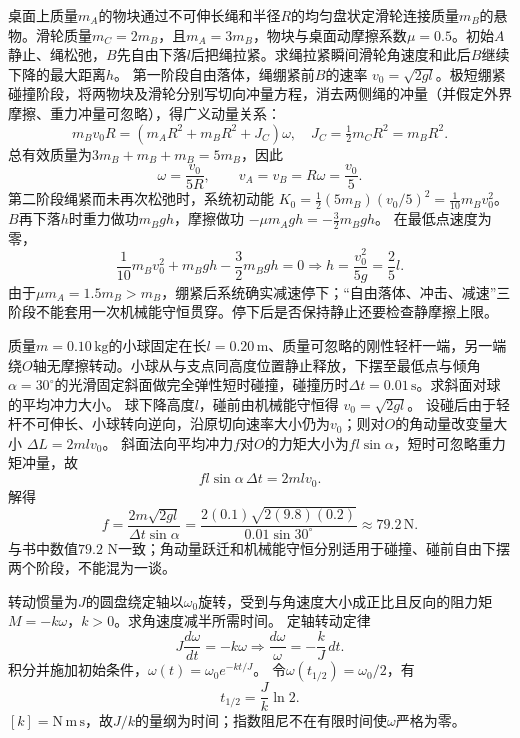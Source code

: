 \problemtext 桌面上质量$m_A$的物块通过不可伸长绳和半径$R$的均匀盘状定滑轮连接质量$m_B$的悬物。滑轮质量$m_C=2m_B$，且$m_A=3m_B$，物块与桌面动摩擦系数$\mu=0.5$。初始$A$静止、绳松弛，$B$先自由下落$l$后把绳拉紧。求绳拉紧瞬间滑轮角速度和此后$B$继续下降的最大距离$h$。
\workings
第一阶段自由落体，绳绷紧前$B$的速率
$v_0=\sqrt{2gl}$。极短绷紧碰撞阶段，将两物块及滑轮分别写切向冲量方程，消去两侧绳的冲量（并假定外界摩擦、重力冲量可忽略），得广义动量关系：
\[
m_Bv_0R=(m_AR^2+m_BR^2+J_C)\omega,\quad
J_C=\tfrac12m_CR^2=m_BR^2.
\]
总有效质量为$3m_B+m_B+m_B=5m_B$，因此
\[
\boxed{\omega=\frac{v_0}{5R}},
\qquad
v_A=v_B=R\omega=\frac{v_0}{5}.
\]
第二阶段绳紧而未再次松弛时，系统初动能
$K_0=\frac12(5m_B)(v_0/5)^2=\frac1{10}m_Bv_0^2$。
$B$再下落$h$时重力做功$m_Bgh$，摩擦做功
$-\mu m_Agh=-\frac32m_Bgh$。
在最低点速度为零，
\[
\frac1{10}m_Bv_0^2+m_Bgh-\frac32m_Bgh=0
\Longrightarrow
\boxed{h=\frac{v_0^2}{5g}=\frac25l}.
\]
\crosscheck 由于$\mu m_A=1.5m_B>m_B$，绷紧后系统确实减速停下；“自由落体、冲击、减速”三阶段不能套用一次机械能守恒贯穿。停下后是否保持静止还要检查静摩擦上限。

\problemtext 质量$m=0.10\,\mathrm{kg}$的小球固定在长$l=0.20\,\mathrm m$、质量可忽略的刚性轻杆一端，另一端绕$O$轴无摩擦转动。小球从与支点同高度位置静止释放，下摆至最低点与倾角$\alpha=30^\circ$的光滑固定斜面做完全弹性短时碰撞，碰撞历时$\Delta t=0.01\,\mathrm s$。求斜面对球的平均冲力大小。
\workings
球下降高度$l$，碰前由机械能守恒得
$v_0=\sqrt{2gl}$。
设碰后由于轻杆不可伸长、小球转向逆向，沿原切向速率大小仍为$v_0$；则对$O$的角动量改变量大小
$\Delta L=2mlv_0$。
斜面法向平均冲力$f$对$O$的力矩大小为$fl\sin\alpha$，短时可忽略重力矩冲量，故
\[
fl\sin\alpha\,\Delta t=2mlv_0.
\]
解得
\[
\boxed{f=\frac{2m\sqrt{2gl}}{\Delta t\sin\alpha}
=\frac{2(0.1)\sqrt{2(9.8)(0.2)}}{0.01\sin30^\circ}
\approx79.2\,\mathrm N}.
\]
\crosscheck 与书中数值$79.2$ N一致；角动量跃迁和机械能守恒分别适用于碰撞、碰前自由下摆两个阶段，不能混为一谈。

\problemtext 转动惯量为$J$的圆盘绕定轴以$\omega_0$旋转，受到与角速度大小成正比且反向的阻力矩$M=-k\omega$，$k>0$。求角速度减半所需时间。
\workings
定轴转动定律
\[
J\frac{d\omega}{dt}=-k\omega
\Longrightarrow
\frac{d\omega}{\omega}=-\frac{k}{J}\,dt.
\]
积分并施加初始条件，$\omega(t)=\omega_0e^{-kt/J}$。
令$\omega(t_{1/2})=\omega_0/2$，有
\[
\boxed{t_{1/2}=\frac{J}{k}\ln2}.
\]
\crosscheck $[k]=\mathrm{N\,m\,s}$，故$J/k$的量纲为时间；指数阻尼不在有限时间使$\omega$严格为零。
